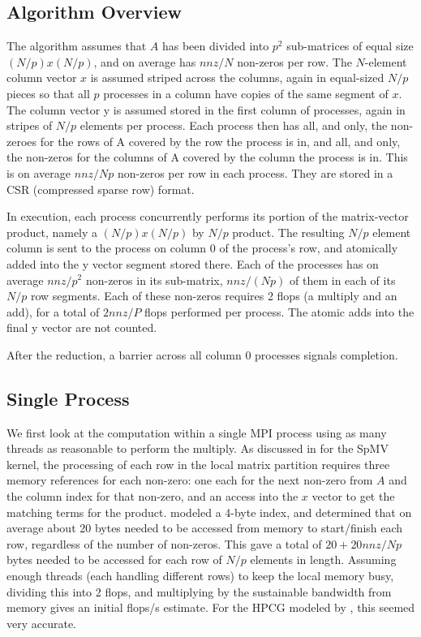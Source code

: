 \subsection{Algorithm Overview}

The algorithm assumes that $A$ has been divided into $p^2$ sub-matrices of equal size $(N/p)x(N/p)$, and on average has $nnz/N$ non-zeros per row. The $N$-element column vector $x$ is assumed striped across the columns, again in equal-sized $N/p$ pieces so that all $p$ processes in a column have copies of the same segment of $x$. The column vector y is assumed stored in the first column of processes, again in stripes of $N/p$ elements per process. Each process then has all, and only, the non-zeroes for the rows of A covered by the row the process is in, and all, and only, the non-zeros for the columns of A covered by the column the process is in. This is on average $nnz/Np$ non-zeros per row in each process. They are stored in a CSR (compressed sparse row) format.

In execution, each process concurrently performs its portion of the matrix-vector product, namely a $(N/p)x(N/p)$ by $N/p$ product. The resulting $N/p$ element column is sent to the process on column 0 of the process's row, and atomically added into the y vector segment stored there. Each of the processes has on average $nnz/p^2$ non-zeros in its sub-matrix, $nnz/(Np)$ of them in each of its $N/p$ row segments. Each of these non-zeros requires 2 flops (a multiply and an add), for a total of $2nnz/P$ flops performed per process. The atomic adds into the final y vector are not counted.

After the reduction, a barrier across all column 0 processes signals completion.

\subsection{Single Process}

We first look at the computation within a single MPI process using as many threads as reasonable to perform the multiply. As discussed in \cite{techbib:marjanovic2014performance} for the SpMV kernel, the processing of each row in the local matrix partition requires three memory references for each non-zero: one each for the next non-zero from $A$ and the column index for that non-zero, and an access into the $x$ vector to get the matching terms for the product. \cite{techbib:marjanovic2014performance} modeled a 4-byte index, and determined that on average about 20 bytes needed to be accessed from memory to start/finish each row, regardless of the number of non-zeros. This gave a total of $20+20nnz/Np$ bytes needed to be accessed for each row of $N/p$ elements in length. Assuming enough threads (each handling different rows) to keep the local memory busy, dividing this into 2 flops, and multiplying by the sustainable bandwidth from memory gives an initial flops/s estimate. For the HPCG modeled by \cite{techbib:marjanovic2014performance}, this seemed very accurate.

